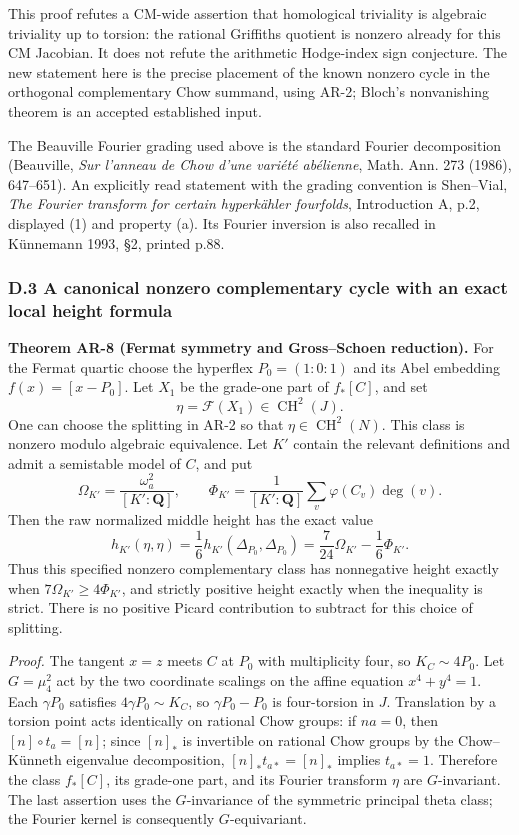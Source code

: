 \documentclass[11pt,a4paper]{article}
\begin{document}
This proof refutes a CM-wide assertion that homological triviality is
algebraic triviality up to torsion: the rational Griffiths quotient is
nonzero already for this CM Jacobian. It does not refute the arithmetic
Hodge-index sign conjecture. The new statement here is the precise
placement of the known nonzero cycle in the orthogonal complementary
Chow summand, using AR-2; Bloch's nonvanishing theorem is an accepted
established input.

The Beauville Fourier grading used above is the standard Fourier
decomposition (Beauville, \emph{Sur l'anneau de Chow d'une variété
abélienne}, Math. Ann. 273 (1986), 647--651). An explicitly read
statement with the grading convention is Shen--Vial, \emph{The Fourier
transform for certain hyperkähler fourfolds}, Introduction A, p.2,
displayed (1) and property (a). Its Fourier inversion is also recalled
in Künnemann 1993, §2, printed p.88.

\subsubsection{D.3 A canonical nonzero complementary cycle with an exact
local height
formula}\label{d.3-a-canonical-nonzero-complementary-cycle-with-an-exact-local-height-formula}

\textbf{Theorem AR-8 (Fermat symmetry and Gross--Schoen reduction).} For
the Fermat quartic choose the hyperflex \(P_0=(1:0:1)\) and its Abel
embedding \(f(x)=[x-P_0]\). Let \(X_1\) be the grade-one part of
\(f_*[C]\), and set \[
\eta=\mathcal F(X_1)\in\operatorname{CH}^2(J).
\] One can choose the splitting in AR-2 so that
\(\eta\in\operatorname{CH}^2(N)\). This class is nonzero modulo
algebraic equivalence. Let \(K'\) contain the relevant definitions and
admit a semistable model of \(C\), and put \[
\Omega_{K'}=\frac{\omega_a^2}{[K':\mathbf Q]},
\qquad
\Phi_{K'}=\frac{1}{[K':\mathbf Q]}
 \sum_v\varphi(C_v)\deg(v).
\] Then the raw normalized middle height has the exact value \[
h_{K'}(\eta,\eta)
 =\frac16 h_{K'}(\Delta_{P_0},\Delta_{P_0})
 =\frac7{24}\Omega_{K'}-\frac16\Phi_{K'}.
\tag{AR.10}
\] Thus this specified nonzero complementary class has nonnegative
height exactly when \(7\Omega_{K'}\ge4\Phi_{K'}\), and strictly positive
height exactly when the inequality is strict. There is no positive
Picard contribution to subtract for this choice of splitting.

\emph{Proof.} The tangent \(x=z\) meets \(C\) at \(P_0\) with
multiplicity four, so \(K_C\sim4P_0\). Let \(G=\mu_4^2\) act by the two
coordinate scalings on the affine equation \(x^4+y^4=1\). Each
\(\gamma P_0\) satisfies \(4\gamma P_0\sim K_C\), so \(\gamma P_0-P_0\)
is four-torsion in \(J\). Translation by a torsion point acts
identically on rational Chow groups: if \(na=0\), then
\([n]\circ t_a=[n]\); since \([n]_*\) is invertible on rational Chow
groups by the Chow--Künneth eigenvalue decomposition,
\([n]_*t_{a*}=[n]_*\) implies \(t_{a*}=1\). Therefore the class
\(f_*[C]\), its grade-one part, and its Fourier transform \(\eta\) are
\(G\)-invariant. The last assertion uses the \(G\)-invariance of the
symmetric principal theta class; the Fourier kernel is consequently
\(G\)-equivariant.
\end{document}
